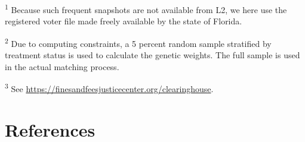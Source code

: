 \documentclass[
  12pt,
]{article}
\begin{document}
\textsuperscript{1} Because such frequent snapshots are not available from L2, we here use the registered voter file made freely available by the state of Florida.

\textsuperscript{2} Due to computing constraints, a 5 percent random sample stratified by treatment status is used to calculate the genetic weights. The full sample is used in the actual matching process.

\textsuperscript{3} See \url{https://finesandfeesjusticecenter.org/clearinghouse}.

\newpage

\hypertarget{references}{%
\section*{References}\label{references}}
\end{document}
